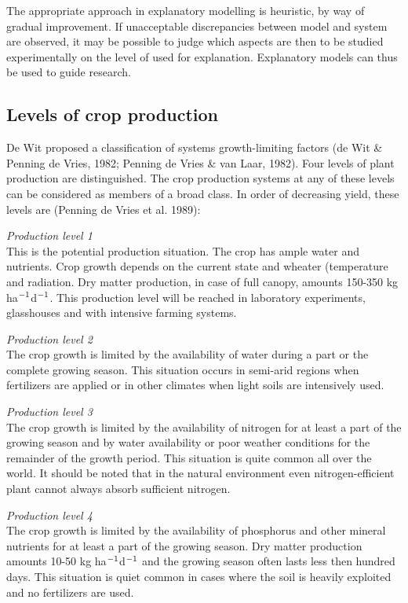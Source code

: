 The appropriate approach in explanatory modelling is heuristic, by way of gradual
improvement. If unacceptable discrepancies between model and system are observed,
it may be possible to judge which aspects are then to be studied experimentally on
the level of used for explanation. Explanatory models can thus be used to guide
research.

\subsection{Levels of crop production}
De Wit proposed a classification of systems growth-limiting factors (de Wit \&
Penning de Vries, 1982; Penning de Vries \& van Laar, 1982). Four levels of plant
production are distinguished. The crop production systems at any of these levels can
be considered as members of a broad class. In order of decreasing yield, these levels
are (Penning de Vries et al. 1989):

{\it Production level 1\/}\\
This is the potential production situation. The crop has ample water and nutrients.
Crop growth depends on the current state and wheater (temperature and radiation.
Dry matter production, in case of full canopy, amounts 150-350 kg ha$^{{\rm -1}}$d$^{{\rm -1}}$. This
production level will be reached in laboratory experiments, glasshouses and with
intensive farming systems.

{\it Production level 2\/}\\
The crop growth is limited by the availability of water during a part or the complete
growing season. This situation occurs in semi-arid regions when fertilizers are applied
or in other climates when light soils are intensively used.

{\it Production level 3\/}\\
The crop growth is limited by the availability of nitrogen for at least a part of the
growing season and by water availability or poor weather conditions for the remainder
of the growth period. This situation is quite common all over the world. It should be
noted that in the natural environment even nitrogen-efficient plant cannot always
absorb sufficient nitrogen.

{\it Production level 4\/}\\
The crop growth is limited by the availability of phosphorus and other mineral
nutrients for at least a part of the growing season. Dry matter production amounts
10-50 kg ha$^{{\rm -1}}$d$^{{\rm -1}}$ and the growing season often lasts less then hundred days. This
situation is quiet common in cases where the soil is heavily exploited and no fertiliz\-ers are used. 

